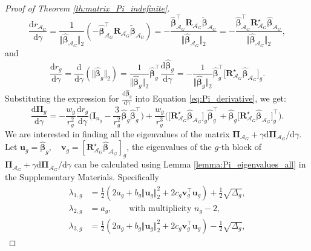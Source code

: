 \documentclass[a4paper, 12pt]{article}
\newcommand{\Aset}{\mathcal{A}}
\newcommand{\betahat}{\widehat{\boldsymbol\beta}}
\newcommand{\T}{\top}
\def\bbeta{\boldsymbol{\beta}}
\def\bPi{\boldsymbol{\Pi}}
\def\bu{\boldsymbol{u}}
\def\bv{\boldsymbol{v}}
\def\bI{\mathbf{I}}
\def\bR{\mathbf{R}}
\def\bu{\mathbf{u}}
\def\bv{\mathbf{v}}
\begin{document}
\begin{appendix}
\begin{proof}[Proof of Theorem \ref{th:matrix_Pi_indefinite}]
\begin{equation*}
\frac{\mathrm{d}r_{\Aset_G}}{\mathrm{d}\gamma}
= \frac{1}{\Vert \widehat{\bbeta}_{\Aset_G} \Vert_2}
\left( -\widehat{\bbeta}_{\Aset_G}^{\T} \bR_{\Aset_G} \widetilde{\bbeta}_{\Aset_G} \right)=-\frac{ \widehat{\bbeta}_{\Aset_G}^{\T} \bR_{\Aset_G} \widetilde{\bbeta}_{\Aset_G} }{ \Vert \widehat{\bbeta}_{\Aset_G} \Vert_2}=-\frac{ \widehat{\bbeta}_{\Aset_G}^{\T} \bR_{\Aset_G}^\star \widehat{\bbeta}_{\Aset_G} }{\Vert \widehat{\bbeta}_{\Aset_G} \Vert_2},
\end{equation*}
and
\begin{equation}
\label{eq:dr_gdgamma}
\frac{\mathrm{d}r_g}{\mathrm{d}\gamma}
= \frac{\mathrm{d}}{\mathrm{d}\gamma} \left( \Vert \widehat{\bbeta}_{g} \Vert_2 \right)
= \frac{1}{\Vert \widehat{\bbeta}_{g} \Vert_2}\widehat{\bbeta}_{g}^{\T} \frac{\mathrm{d}\widehat{\bbeta}_{g}}{\mathrm{d}\gamma}=-\frac{1}{\Vert \widehat{\bbeta}_{g} \Vert_2}\widehat{\bbeta}_{g}^{\T} \Big[\bR_{\Aset_G}^\star\betahat_{\Aset_G}\Big]_g.%
\end{equation}
Substituting the expression for $\frac{\mathrm{d}\betahat_g}{\mathrm{d}\gamma}$ into Equation 
\eqref{eq:Pi_derivative}, we get:
\begin{equation}
\label{eq:Pi_derivative_final}
\frac{\mathrm{d}\bPi_{g}}{\mathrm{d}\gamma}
= -\frac{w_g}{r_g^2}\frac{\mathrm{d}r_g}{\mathrm{d}\gamma}\Big(\bI_{n_g}-\frac{3}{r_g^2} \widehat{\bbeta}_g \widehat{\bbeta}_g^{\T} \Big)+  \frac{w_g}{r_g^3} \Big(\Big[\bR_{\Aset_G}^\star\widehat{\bbeta}_{\Aset_G}\Big]_g \widehat{\bbeta}_g^{\T} + \widehat{\bbeta}_g \Big[\bR_{\Aset_G}^\star\widehat{\bbeta}_{\Aset_G}\Big]_g^{\T} \Big).
\end{equation}
We are interested in finding all the eigenvalues of the matrix $\bPi_{\Aset_G}+\gamma \mathrm{d}  \bPi_{\Aset_G}/\mathrm{d} \gamma$. Let $\bu_g = \widehat{\bbeta}_g,\quad \bv_g = \left[\bR_{\Aset_G}^\star \widehat{\bbeta}_{\Aset_G} \right]_g$, the eigenvalues of the $g$-th block of $\bPi_{\Aset_G}+\gamma \mathrm{d}  \bPi_{\Aset_G}/\mathrm{d} \gamma$ can be calculated using Lemma \ref{lemma:Pi_eigenvalues_all} in the Supplementary Materials. Specifically
\begin{align*}
\lambda_{1,g} &= \frac{1}{2}(2 a_g+b_g \Vert\bu_g\Vert_2^2+2 c_g \bv_g^{\T}\bu_g) + \frac{1}{2}\sqrt{\Delta_g}, \\
\lambda_{2,g} &= a_g, \qquad \text{with multiplicity } n_g - 2, \\
\lambda_{3,g} &= \frac{1}{2}(2 a_g+b_g \Vert\bu_g\Vert_2^2+2 c_g \bv_g^{\T}\bu_g) - \frac{1}{2}\sqrt{\Delta_g},

\end{align*}
\end{proof}
\end{appendix}
\end{document}

